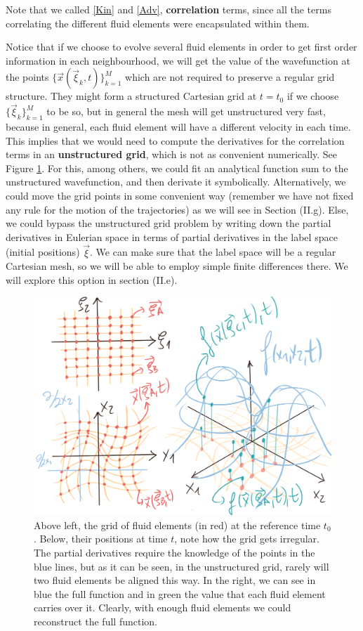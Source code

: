 \documentclass[11pt, a4paper]{article} %
\begin{document}
Note that we called \eqref{Kin} and \eqref{Adv}, {\bf correlation} terms, since all the terms correlating the different fluid elements were encapsulated within them.\vspace{-0.1cm}

Notice that if we choose to evolve several fluid elements in order to get first order information in each neighbourhood, we will get the value of the wavefunction at the points $\{\vec{x}(\vec{\xi}_k,t)\}_{k=1}^M$ which are not required to preserve a regular grid structure. They might form a structured Cartesian grid at $t=t_0$ if we choose $\{\vec{\xi}_k\}_{k=1}^M$ to be so, but in general the mesh will get unstructured very fast, because in general, each fluid element will have a different velocity in each time. This implies that we would need to compute the derivatives for the correlation terms in an {\bf unstructured grid}, which is not as convenient numerically. See Figure \ref{fig:unstructure_fluid}. For this, among others, we could fit an analytical function sum to the unstructured wavefunction, and then derivate it symbolically. Alternatively, we could move the grid points in some convenient way (remember we have not fixed any rule for the motion of the trajectories) as we will see in Section (II.g). Else, we could bypass the unstructured grid problem by writing down the partial derivatives in Eulerian space in terms of partial derivatives in the label space (initial positions) $\vec{\xi}$. We can make sure that the label space will be a regular Cartesian mesh, so we will be able to employ simple finite differences there. We will explore this option in section (II.e). \vspace{0.15cm}
\begin{figure}[h!]
  \centering
    \includegraphics[width=0.64\linewidth]{azkena.png}
  \caption{Above left, the grid of fluid elements (in red) at the reference time $t_0$. Below, their positions at time $t$, note how the grid gets irregular. The partial derivatives require the knowledge of the points in the blue lines, but as it can be seen, in the unstructured grid, rarely will two fluid elements be aligned this way. In the right, we can see in blue the full function and in green the value that each fluid element carries over it. Clearly, with enough fluid elements we could reconstruct the full function.   \vspace{-0.4cm}}
  \label{fig:unstructure_fluid}
\end{figure}
\end{document}
